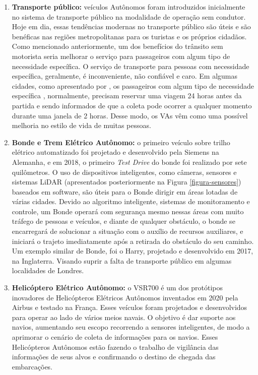 \begin{enumerate}
\item \textbf{Transporte público:} veículos Autônomos foram introduzidos inicialmente no sistema de transporte público na modalidade de operação sem condutor. Hoje em dia, essas tendências modernas no transporte público são úteis e são benéficas nas regiões metropolitanas para os turistas e os próprios cidadãos. Como mencionado anteriormente, um dos benefícios do trânsito sem motorista seria melhorar o serviço para passageiros com algum tipo de necessidade específica. O serviço de transporte para pessoas com necessidade específica, geralmente, é inconveniente, não confiável e caro. Em algumas cidades, como apresentado por \cite{notif}, os passageiros com algum tipo de necessidade específica %
, normalmente, precisam reservar uma viagem 24 horas antes da partida e sendo informados de que a coleta pode ocorrer a qualquer momento durante uma janela de 2 horas. Desse modo, os VAs vêm como uma possível melhoria no estilo de vida de muitas pessoas.
\item \textbf{Bonde e Trem Elétrico Autônomo:} o primeiro veículo sobre trilho elétrico automatizado foi projetado e desenvolvido pela Siemens na Alemanha, e em 2018, o primeiro \textit{Test Drive} do bonde foi realizado por sete quilômetros. O uso de dispositivos inteligentes, como câmeras, sensores e sistemas LiDAR (apresentados posteriormente na Figura \ref{figura-sensores}) baseados em software, são úteis para o Bonde dirigir em áreas lotadas de várias cidades. Devido ao algoritmo inteligente, sistemas de monitoramento e controle, um Bonde operará com segurança mesmo nessas áreas com muito tráfego de pessoas e veículos, e diante de qualquer obstáculo, o bonde se encarregará de solucionar a situação com o auxílio de recursos auxiliares, e iniciará o trajeto imediatamente após a retirada do obstáculo do seu caminho. Um exemplo similar de Bonde, foi o Harry, projetado e desenvolvido em 2017, na Inglaterra. Visando suprir a falta de transporte público em algumas localidades de Londres.
\item \textbf{Helicóptero Elétrico Autônomo:} o VSR700 é um dos protótipos inovadores de Helicópteros Elétricos Autônomos inventados em 2020 pela Airbus e testado na França. Esses veículos foram projetados e desenvolvidos para operar ao lado de vários meios navais. O objetivo é dar suporte aos navios, aumentando seu escopo recorrendo a sensores inteligentes, de modo a aprimorar o cenário de coleta de informações para os navios. Esses Helicópteros Autônomos estão fazendo o trabalho de vigilância das informações de seus alvos e confirmando o destino de chegada das embarcações.

\end{enumerate}
